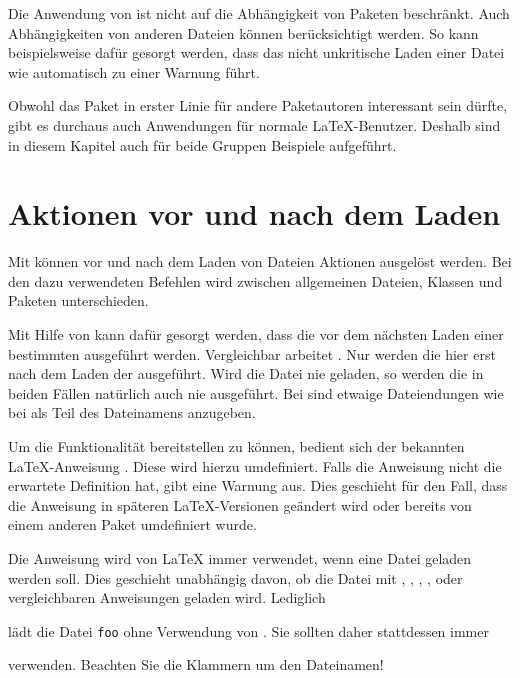   Die Anwendung von  ist nicht auf die Abhängigkeit
  von Paketen beschränkt. Auch Abhängigkeiten von anderen Dateien
  können berücksichtigt werden. So kann beispielsweise dafür gesorgt
  werden, dass das nicht unkritische Laden einer Datei wie
   automatisch zu einer Warnung führt.

  Obwohl das Paket in erster Linie für andere Paketautoren interessant
  sein dürfte, gibt es durchaus auch Anwendungen für normale
  \LaTeX-Benutzer. Deshalb sind in diesem Kapitel auch für beide
  Gruppen Beispiele aufgeführt.


\section{Aktionen vor und nach dem Laden}

Mit  können vor und nach dem Laden von Dateien Aktionen
ausgelöst werden. Bei den dazu verwendeten Befehlen wird zwischen allgemeinen
Dateien, Klassen und Paketen unterschieden.


\begin{Declaration}
\end{Declaration}%
Mit Hilfe von  kann dafür gesorgt werden, dass die
 vor dem nächsten Laden einer bestimmten 
ausgeführt werden. Vergleichbar arbeitet . Nur werden die
 hier erst nach dem Laden der 
ausgeführt. Wird die Datei nie geladen, so werden die  in
beiden Fällen natürlich auch nie ausgeführt. Bei  sind etwaige
Dateiendungen wie bei  als Teil des Dateinamens anzugeben.

Um die Funktionalität bereitstellen zu können, bedient sich 
der bekannten \LaTeX-Anweisung
. Diese wird hierzu umdefiniert.
Falls die Anweisung nicht die erwartete Definition hat, gibt
 eine Warnung aus.  Dies geschieht für den Fall, dass die
Anweisung in späteren \LaTeX-Versionen geändert wird oder bereits von einem
anderen Paket umdefiniert wurde.
  
Die Anweisung  wird von \LaTeX{} immer verwendet,
wenn eine Datei geladen werden soll. Dies geschieht unabhängig davon, ob die
Datei mit , , ,
,  oder vergleichbaren Anweisungen
geladen wird. Lediglich
\begin{lstcode}
  
\end{lstcode}
lädt die Datei \texttt{foo} ohne Verwendung von . Sie
sollten daher stattdessen immer
\begin{lstcode}
  
\end{lstcode}
verwenden. Beachten Sie die Klammern um den Dateinamen!%
%
\EndIndexGroup


